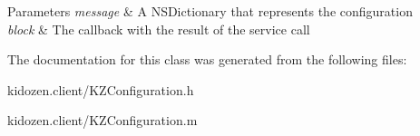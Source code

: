 \begin{DoxyParams}{Parameters}
{\em message} & A N\-S\-Dictionary that represents the configuration \\
\hline
{\em block} & The callback with the result of the service call \\
\hline
\end{DoxyParams}


The documentation for this class was generated from the following files\-:\begin{DoxyCompactItemize}
\item 
kidozen.\-client/K\-Z\-Configuration.\-h\item 
kidozen.\-client/K\-Z\-Configuration.\-m\end{DoxyCompactItemize}
